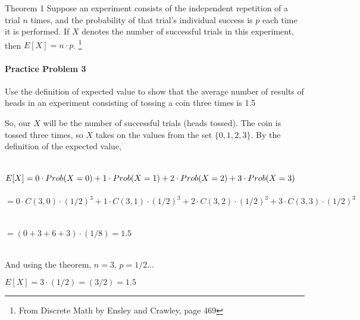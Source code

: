 \documentclass[a4paper,12pt]{book}
\begin{document}
        \begin{intro}{Theorem 1}
            Suppose an experiment consists of the independent repetition
            of a trial $n$ times, and the probability of that trial's
            individual success is $p$ each time it is performed.
            If $X$ denotes the number of successful trials in this experiment,
            then $E[X] = n \cdot p$.
            \footnote{From Discrete Math by Ensley and Crawley, page 469}

            \paragraph{Practice Problem 3}
            Use the definition of expected value to show that the average
            number of results of heads in an experiment
            consisting of tossing a coin three times is 1.5

            So, our $X$ will be the number of successful trials (heads tossed).
            The coin is tossed three times, so $X$ takes on the values from
            the set $\{0, 1, 2, 3\}$. By the definition of the expected value,

            ~\\
            $E[X] = \\ 0 \cdot Prob(X = 0) + 1 \cdot Prob(X = 1) + 2 \cdot Prob(X = 2)
            + 3 \cdot Prob(X = 3)$ ~\\~\\
            $= 0 \cdot C(3,0) \cdot (1/2)^{3} + 1 \cdot C(3,1) \cdot (1/2)^{3}
            + 2 \cdot C(3,2) \cdot (1/2)^{3} + 3 \cdot C(3,3) \cdot (1/2)^{3}$ ~\\~\\
            $ = (0 + 3 + 6 + 3) \cdot (1/8) = 1.5$

            ~\\
            And using the theorem, $n = 3$, $p = 1/2$...

            $E[X] = 3 \cdot (1/2) = (3/2) = 1.5$
        \end{intro}
\end{document}
